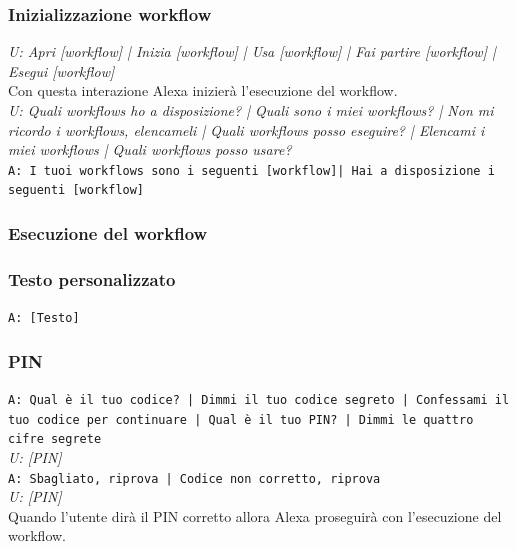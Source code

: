 \subsubsection{Inizializzazione workflow}
\textit{U: Apri [workflow] | Inizia [workflow] | Usa [workflow] | Fai partire [workflow] | Esegui [workflow]}\\
Con questa interazione Alexa inizierà l'esecuzione del workflow.\\
\textit{U: Quali workflows ho a disposizione? | Quali sono i miei workflows? | Non mi ricordo i workflows, elencameli | Quali workflows posso eseguire? | Elencami i miei workflows | Quali workflows posso usare?}\\
\texttt{A: I tuoi workflows sono i seguenti [workflow]| Hai a disposizione i seguenti [workflow]}\\

\subsubsection{Esecuzione del workflow}

\subsubsection{Testo personalizzato}
\texttt{A: [Testo]}

\subsubsection{PIN}
\texttt{A: Qual è il tuo codice? | Dimmi il tuo codice segreto | Confessami il tuo codice per continuare | Qual è il tuo PIN? | Dimmi le quattro cifre segrete}\\
\textit{U: [PIN]}\\
\texttt{A: Sbagliato, riprova | Codice non corretto, riprova}\\
\textit{U: [PIN]}\\
Quando l'utente dirà il PIN corretto allora Alexa proseguirà con l'esecuzione del workflow.

